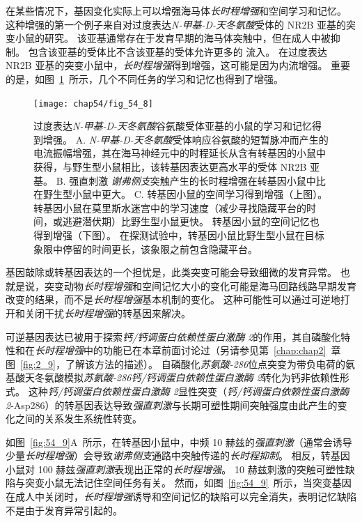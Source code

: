 在某些情况下，基因变化实际上可以增强海马体\textit{长时程增强}和空间学习和记忆。
这种增强的第一个例子来自对过度表达\textit{N-甲基-D-天冬氨酸}受体的 NR2B 亚基的突变小鼠的研究。
该亚基通常存在于发育早期的海马体突触中，但在成人中被抑制。
包含该亚基的受体比不含该亚基的受体允许更多的  流入。
在过度表达 NR2B 亚基的突变小鼠中，\textit{长时程增强}得到增强，这可能是因为内流增强。
重要的是，如图~\ref{fig:54_8}~所示，几个不同任务的学习和记忆也得到了增强。


\begin{figure}[htbp]
	\centering
	\texttt{[image: chap54/fig\_54\_8]}
	\caption{过度表达\textit{N-甲基-D-天冬氨酸}谷氨酸受体亚基的小鼠的学习和记忆得到增强。
		A. \textit{N-甲基-D-天冬氨酸}受体响应谷氨酸的短暂脉冲而产生的电流振幅增强，其在海马神经元中的时程延长从含有转基因的小鼠中获得，与野生型小鼠相比，该转基因表达更高水平的受体 NR2B 亚基。
		B. 强直刺激 \textit{谢弗侧支}突触产生的长时程增强在转基因小鼠中比在野生型小鼠中更大。
		C. 转基因小鼠的空间学习得到增强（上图）。
		转基因小鼠在莫里斯水迷宫中的学习速度（减少寻找隐藏平台的时间，或逃避潜伏期）比野生型小鼠更快。
		转基因小鼠的空间记忆也得到增强（下图）。
		在探测试验中，转基因小鼠比野生型小鼠在目标象限中停留的时间更长，该象限之前包含隐藏平台。}
	\label{fig:54_8}
\end{figure}


基因敲除或转基因表达的一个担忧是，此类突变可能会导致细微的发育异常。
也就是说，突变动物\textit{长时程增强}和空间记忆大小的变化可能是海马回路线路早期发育改变的结果，而不是\textit{长时程增强}基本机制的变化。
这种可能性可以通过可逆地打开和关闭干扰\textit{长时程增强}的转基因来解决。


可逆基因表达已被用于探索\textit{钙/钙调蛋白依赖性蛋白激酶 2}的作用，其自磷酸化特性和在\textit{长时程增强}中的功能已在本章前面讨论过（另请参见第~\ref{chap:chap2}~章图~\ref{fig:2_9}，了解该方法的描述）。
自磷酸化\textit{苏氨酸-286}位点突变为带负电荷的氨基酸天冬氨酸模拟\textit{苏氨酸-286}\textit{钙/钙调蛋白依赖性蛋白激酶 2}转化为钙非依赖性形式。
这种\textit{钙/钙调蛋白依赖性蛋白激酶 2}显性突变（\textit{钙/钙调蛋白依赖性蛋白激酶 2}-Asp286）的转基因表达导致\textit{强直刺激}与长期可塑性期间突触强度由此产生的变化之间的关系发生系统性转变。


如图~\ref{fig:54_9}A~所示，在转基因小鼠中，中频 10 赫兹的\textit{强直刺激}（通常会诱导少量\textit{长时程增强}）会导致\textit{谢弗侧支}通路中突触传递的\textit{长时程抑制}。
相反，转基因小鼠对 100 赫兹\textit{强直刺激}表现出正常的\textit{长时程增强}。
10 赫兹刺激的突触可塑性缺陷与突变小鼠无法记住空间任务有关。
然而，如图~\ref{fig:54_9}~所示，当突变基因在成人中关闭时，\textit{长时程增强}诱导和空间记忆的缺陷可以完全消失，表明记忆缺陷不是由于发育异常引起的。


